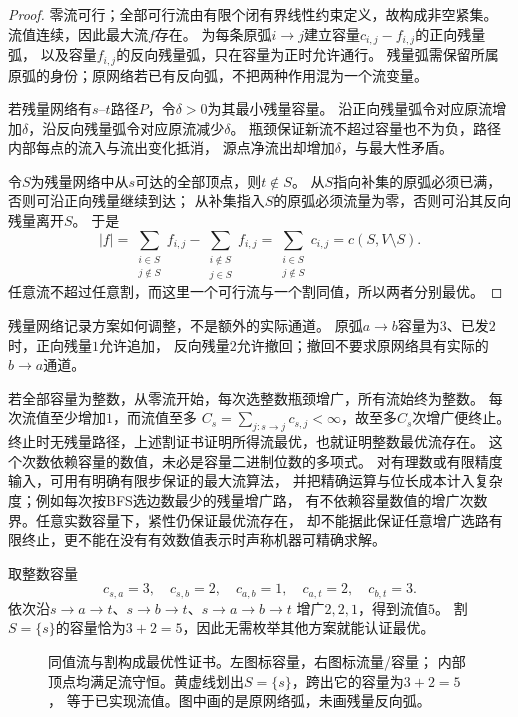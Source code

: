 \begin{proof}
零流可行；全部可行流由有限个闭有界线性约束定义，故构成非空紧集。
流值连续，因此最大流\(f\)存在。
为每条原弧\(i\to j\)建立容量\(c_{i,j}-f_{i,j}\)的正向残量弧，
以及容量\(f_{i,j}\)的反向残量弧，只在容量为正时允许通行。
残量弧需保留所属原弧的身份；原网络若已有反向弧，不把两种作用混为一个流变量。

若残量网络有\(s\)--\(t\)路径\(P\)，令\(\delta>0\)为其最小残量容量。
沿正向残量弧令对应原流增加\(\delta\)，沿反向残量弧令对应原流减少\(\delta\)。
瓶颈保证新流不超过容量也不为负，路径内部每点的流入与流出变化抵消，
源点净流出却增加\(\delta\)，与最大性矛盾。

令\(S\)为残量网络中从\(s\)可达的全部顶点，则\(t\notin S\)。
从\(S\)指向补集的原弧必须已满，否则可沿正向残量继续到达；
从补集指入\(S\)的原弧必须流量为零，否则可沿其反向残量离开\(S\)。
于是
\[
  |f|=\sum_{\substack{i\in S\\j\notin S}}f_{i,j}
        -\sum_{\substack{i\notin S\\j\in S}}f_{i,j}
      =\sum_{\substack{i\in S\\j\notin S}}c_{i,j}
      =c(S,V\setminus S).
\]
任意流不超过任意割，而这里一个可行流与一个割同值，所以两者分别最优。
\end{proof}

残量网络记录方案如何调整，不是额外的实际通道。
原弧\(a\to b\)容量为\(3\)、已发\(2\)时，正向残量\(1\)允许追加，
反向残量\(2\)允许撤回；撤回不要求原网络具有实际的\(b\to a\)通道。

若全部容量为整数，从零流开始，每次选整数瓶颈增广，所有流始终为整数。
每次流值至少增加\(1\)，而流值至多
\(C_s=\sum_{j:s\to j}c_{s,j}<\infty\)，故至多\(C_s\)次增广便终止。
终止时无残量路径，上述割证书证明所得流最优，也就证明整数最优流存在。
这个次数依赖容量的数值，未必是容量二进制位数的多项式。
对有理数或有限精度输入，可用有明确有限步保证的最大流算法，
并把精确运算与位长成本计入复杂度；例如每次按BFS选边数最少的残量增广路，
有不依赖容量数值的增广次数界。任意实数容量下，紧性仍保证最优流存在，
却不能据此保证任意增广选路有限终止，更不能在没有有效数值表示时声称机器可精确求解。

取整数容量
\[
  c_{s,a}=3,\quad c_{s,b}=2,\quad c_{a,b}=1,\quad
  c_{a,t}=2,\quad c_{b,t}=3.
\]
依次沿\(s\to a\to t\)、\(s\to b\to t\)、\(s\to a\to b\to t\)
增广\(2,2,1\)，得到流值\(5\)。
割\(S=\{s\}\)的容量恰为\(3+2=5\)，因此无需枚举其他方案就能认证最优。

\begin{figure}[htbp]
  \centering
  
  \caption{同值流与割构成最优性证书。左图标容量，右图标流量/容量；
  内部顶点均满足流守恒。黄虚线划出\(S=\{s\}\)，跨出它的容量为\(3+2=5\)，
  等于已实现流值。图中画的是原网络弧，未画残量反向弧。}
  \label{fig:graph-theory-flow-cut-certificate}
\end{figure}

